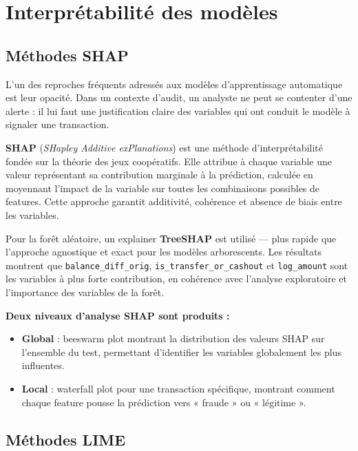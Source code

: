 \section{Interprétabilité des modèles}

\subsection{Méthodes SHAP}

L'un des reproches fréquents adressés aux modèles d'apprentissage automatique est leur
opacité. Dans un contexte d'audit, un analyste ne peut se contenter d'une alerte : il lui
faut une justification claire des variables qui ont conduit le modèle à signaler une
transaction.

\begin{definitionbox}
\textbf{SHAP} (\textit{SHapley Additive exPlanations}) est une méthode d'interprétabilité
fondée sur la théorie des jeux coopératifs. Elle attribue à chaque variable une valeur
représentant sa contribution marginale à la prédiction, calculée en moyennant l'impact de
la variable sur toutes les combinaisons possibles de features. Cette approche garantit
additivité, cohérence et absence de biais entre les variables.
\end{definitionbox}

Pour la forêt aléatoire, un explainer \textbf{TreeSHAP} est utilisé --- plus rapide que
l'approche agnostique et exact pour les modèles arborescents. Les résultats montrent que
\texttt{balance\_diff\_orig}, \texttt{is\_transfer\_or\_cashout} et
\texttt{log\_amount} sont les variables à plus forte contribution, en cohérence avec
l'analyse exploratoire et l'importance des variables de la forêt.

\textbf{Deux niveaux d'analyse SHAP sont produits :}
\begin{itemize}
  \item \textbf{Global} : beeswarm plot montrant la distribution des valeurs SHAP sur
    l'ensemble du test, permettant d'identifier les variables globalement les plus
    influentes.
  \item \textbf{Local} : waterfall plot pour une transaction spécifique, montrant
    comment chaque feature pousse la prédiction vers « fraude » ou « légitime ».
\end{itemize}

\subsection{Méthodes LIME}


